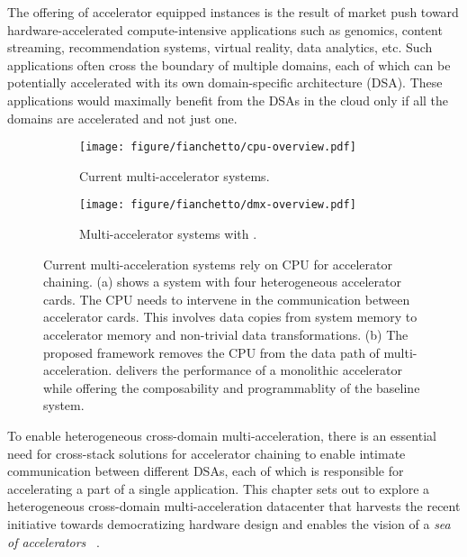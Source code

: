 The offering of accelerator equipped instances is the result of market push toward hardware-accelerated compute-intensive applications such as genomics, content streaming, recommendation systems, virtual reality, data analytics, etc. 
%
Such applications often cross the boundary of multiple domains, each of which can be potentially accelerated with its own domain-specific architecture (DSA). 
%
These applications would maximally benefit from the DSAs in the cloud only if all the domains are accelerated and not just one. 
%

%
\begin{figure}[ht!]
    \centering
    \begin{subfigure}[b]{\columnwidth}
    \texttt{[image: figure/fianchetto/cpu-overview.pdf]}
    \caption{Current multi-accelerator systems.}
    \label{fig:overview:current}
    \end{subfigure}
    \hspace{0.5in}
    \begin{subfigure}[b]{\columnwidth}
    \texttt{[image: figure/fianchetto/dmx-overview.pdf]}
    \caption{Multi-accelerator systems with \dmx.}
    \label{fig:overview:dmx}
    \end{subfigure}
    \caption[Current multi-acceleration systems rely on CPU for accelerator chaining.]{Current multi-acceleration systems rely on CPU for accelerator chaining. (a) shows a system with four heterogeneous accelerator cards. The CPU needs to intervene in the communication between accelerator cards. This involves data copies from system memory to accelerator memory and non-trivial data transformations. (b) The proposed \dmx framework removes the CPU from the data path of multi-acceleration. \dmx delivers the performance of a monolithic accelerator while offering the composability and programmablity of the baseline system.}
    
\label{fig:overview}
\end{figure}

To enable heterogeneous cross-domain multi-acceleration, there is an essential need for cross-stack solutions for accelerator chaining to enable intimate communication between different DSAs, each of which is responsible for accelerating a part of a single application. 
%
This chapter sets out to explore a heterogeneous cross-domain multi-acceleration datacenter that harvests the recent initiative towards democratizing hardware design and enables the vision of a \textit{sea of accelerators}
~\cite{pymtl3:ieee-micro:2020, basejump:dac:2018, blackparrot:ieee-micro:2020, democratizing:cacm:2022, profiling:isca:2023}.

